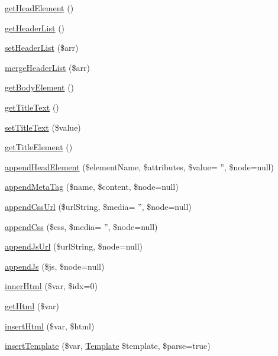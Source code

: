\begin{DoxyCompactItemize}
\item 
\hyperlink{classDom_1_1Template_aa194ccf2a12742ffac6f75eb46873b35}{get\+Head\+Element} ()
\item 
\hyperlink{classDom_1_1Template_a6f531666a86196a65907367946da523e}{get\+Header\+List} ()
\item 
\hyperlink{classDom_1_1Template_aa4af5237601569e2f515b66d41de2b0c}{set\+Header\+List} (\$arr)
\item 
\hyperlink{classDom_1_1Template_a65f4b31082f9bb5b05a079af93bcd929}{merge\+Header\+List} (\$arr)
\item 
\hyperlink{classDom_1_1Template_af48dfeb5276fd8298f5e219bfd5c6eff}{get\+Body\+Element} ()
\item 
\hyperlink{classDom_1_1Template_a55edbc6c8fb5d2180bb33d9524b44410}{get\+Title\+Text} ()
\item 
\hyperlink{classDom_1_1Template_a35428be8b05fb87243e31a880f5abc2d}{set\+Title\+Text} (\$value)
\item 
\hyperlink{classDom_1_1Template_a4fb6ad1a1fe993d74e9f702248f31e80}{get\+Title\+Element} ()
\item 
\hyperlink{classDom_1_1Template_aa891209807a59166acf86b0f48ddeb68}{append\+Head\+Element} (\$element\+Name, \$attributes, \$value= '', \$node=null)
\item 
\hyperlink{classDom_1_1Template_aa08a5c9dfad1b3011755986fad969d50}{append\+Meta\+Tag} (\$name, \$content, \$node=null)
\item 
\hyperlink{classDom_1_1Template_a8211e4d2bea5166432c81af214927dbb}{append\+Css\+Url} (\$url\+String, \$media= '', \$node=null)
\item 
\hyperlink{classDom_1_1Template_aecdfb849fd56545a8a5375a735545217}{append\+Css} (\$css, \$media= '', \$node=null)
\item 
\hyperlink{classDom_1_1Template_afaac837b5ecdb9853a75128ed1dbe7ee}{append\+Js\+Url} (\$url\+String, \$node=null)
\item 
\hyperlink{classDom_1_1Template_aa672e3c0b80aa7fae6e6d99651e2dfb3}{append\+Js} (\$js, \$node=null)
\item 
\hyperlink{classDom_1_1Template_a1b28a9d82d57340c923ff73c7676da26}{inner\+Html} (\$var, \$idx=0)
\item 
\hyperlink{classDom_1_1Template_a5090df44c6536932eb36dc8051ae5875}{get\+Html} (\$var)
\item 
\hyperlink{classDom_1_1Template_a9d7bece84df26f9aca904d38a5434c29}{insert\+Html} (\$var, \$html)
\item 
\hyperlink{classDom_1_1Template_ac153a31595f2f0a5e3c8125041de2764}{insert\+Template} (\$var, \hyperlink{classDom_1_1Template}{Template} \$template, \$parse=true)

\end{DoxyCompactItemize}
